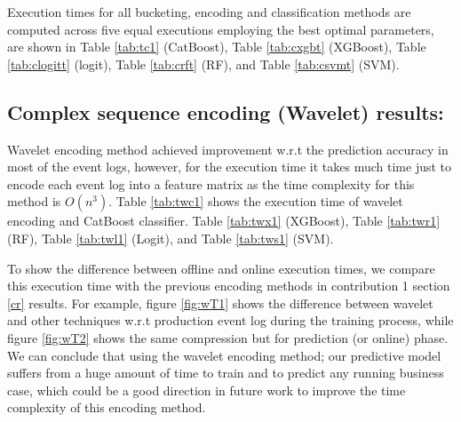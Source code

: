 Execution times for all bucketing, encoding and classification methods are computed across five equal executions employing the best optimal parameters, are shown in Table \ref{tab:tc1} (CatBoost), Table  \ref{tab:cxgbt} (XGBoost), Table \ref{tab:clogitt} (logit), Table \ref{tab:crft} (RF), and Table  \ref{tab:csvmt} (SVM).









\subsection{Complex sequence encoding (Wavelet) results:}
Wavelet encoding method achieved improvement w.r.t the prediction accuracy in most of the event logs, however, for the execution time it takes much time just to encode each event log into a feature matrix as the time complexity for this method is $O(n^3)$. Table \ref{tab:twc1} shows the execution time of wavelet encoding and CatBoost classifier. Table \ref{tab:twx1} (XGBoost), Table \ref{tab:twr1} (RF), Table \ref{tab:twl1} (Logit), and Table \ref{tab:tws1} (SVM).


To show the difference between offline and online execution times, we compare this execution time with the previous encoding methods in contribution 1 section \ref{cr} results.  For example, figure \ref{fig:wT1} shows the difference between wavelet and other techniques w.r.t production event log during the training process, while figure \ref{fig:wT2} shows the same compression but for prediction (or online) phase. We can conclude that using the wavelet encoding method; our predictive model suffers from a huge amount of time to train and to predict any running business case, which could be a good direction in future work to improve the time complexity of this encoding method. 

